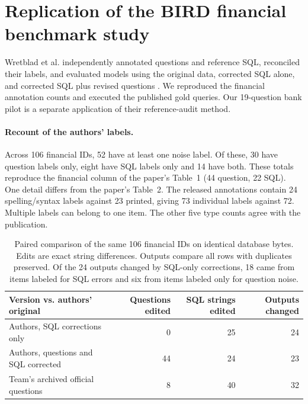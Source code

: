 \documentclass[11pt,a4paper,onecolumn,oneside]{rho-class/rho}
\begin{document}
\clearpage

\section{Replication of the BIRD financial benchmark study}
\label{sec:s7}

Wretblad et al. independently annotated questions and reference SQL, reconciled their labels, and evaluated models using the original data, corrected SQL alone, and corrected SQL plus revised questions \citep{wretblad}. We reproduced the financial annotation counts and executed the published gold queries. Our 19-question bank pilot is a separate application of their reference-audit method.

\paragraph{Recount of the authors' labels.}
Across 106 financial IDs, 52 have at least one noise label. Of these, 30 have question labels only, eight have SQL labels only and 14 have both. These totals reproduce the financial column of the paper's Table~1 (44 question, 22 SQL). One detail differs from the paper's Table~2. The released annotations contain 24 spelling/syntax labels against 23 printed, giving 73 individual labels against 72. Multiple labels can belong to one item. The other five type counts agree with the publication.

\begin{table}[H]
\centering\small\renewcommand{\arraystretch}{1.25}
\begin{tabularx}{\linewidth}{@{}Xrrr@{}}
\toprule
\textbf{Version vs. authors' original} & \textbf{Questions edited} & \textbf{SQL strings edited} & \textbf{Outputs changed}\\\midrule
Authors, SQL corrections only & 0 & 25 & 24\\
Authors, questions and SQL corrected & 44 & 24 & 23\\
Team's archived official questions & 8 & 40 & 32\\
\bottomrule
\end{tabularx}
\caption{Paired comparison of the same 106 financial IDs on identical database bytes. Edits are exact string differences. Outputs compare all rows with duplicates preserved. Of the 24 outputs changed by SQL-only corrections, 18 came from items labeled for SQL errors and six from items labeled only for question noise.}
\end{table}
\end{document}
